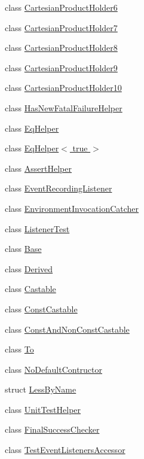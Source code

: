 \begin{DoxyCompactItemize}
\item 
class \hyperlink{classtesting_1_1internal_1_1CartesianProductHolder6}{\-Cartesian\-Product\-Holder6}
\item 
class \hyperlink{classtesting_1_1internal_1_1CartesianProductHolder7}{\-Cartesian\-Product\-Holder7}
\item 
class \hyperlink{classtesting_1_1internal_1_1CartesianProductHolder8}{\-Cartesian\-Product\-Holder8}
\item 
class \hyperlink{classtesting_1_1internal_1_1CartesianProductHolder9}{\-Cartesian\-Product\-Holder9}
\item 
class \hyperlink{classtesting_1_1internal_1_1CartesianProductHolder10}{\-Cartesian\-Product\-Holder10}
\item 
class \hyperlink{classtesting_1_1internal_1_1HasNewFatalFailureHelper}{\-Has\-New\-Fatal\-Failure\-Helper}
\item 
class \hyperlink{classtesting_1_1internal_1_1EqHelper}{\-Eq\-Helper}
\item 
class \hyperlink{classtesting_1_1internal_1_1EqHelper_3_01true_01_4}{\-Eq\-Helper$<$ true $>$}
\item 
class \hyperlink{classtesting_1_1internal_1_1AssertHelper}{\-Assert\-Helper}
\item 
class \hyperlink{classtesting_1_1internal_1_1EventRecordingListener}{\-Event\-Recording\-Listener}
\item 
class \hyperlink{classtesting_1_1internal_1_1EnvironmentInvocationCatcher}{\-Environment\-Invocation\-Catcher}
\item 
class \hyperlink{classtesting_1_1internal_1_1ListenerTest}{\-Listener\-Test}
\item 
class \hyperlink{classtesting_1_1internal_1_1Base}{\-Base}
\item 
class \hyperlink{classtesting_1_1internal_1_1Derived}{\-Derived}
\item 
class \hyperlink{classtesting_1_1internal_1_1Castable}{\-Castable}
\item 
class \hyperlink{classtesting_1_1internal_1_1ConstCastable}{\-Const\-Castable}
\item 
class \hyperlink{classtesting_1_1internal_1_1ConstAndNonConstCastable}{\-Const\-And\-Non\-Const\-Castable}
\item 
class \hyperlink{classtesting_1_1internal_1_1To}{\-To}
\item 
class \hyperlink{classtesting_1_1internal_1_1NoDefaultContructor}{\-No\-Default\-Contructor}
\item 
struct \hyperlink{structtesting_1_1internal_1_1LessByName}{\-Less\-By\-Name}
\item 
class \hyperlink{classtesting_1_1internal_1_1UnitTestHelper}{\-Unit\-Test\-Helper}
\item 
class \hyperlink{classtesting_1_1internal_1_1FinalSuccessChecker}{\-Final\-Success\-Checker}
\item 
class \hyperlink{classtesting_1_1internal_1_1TestEventListenersAccessor}{\-Test\-Event\-Listeners\-Accessor}
\end{DoxyCompactItemize}
